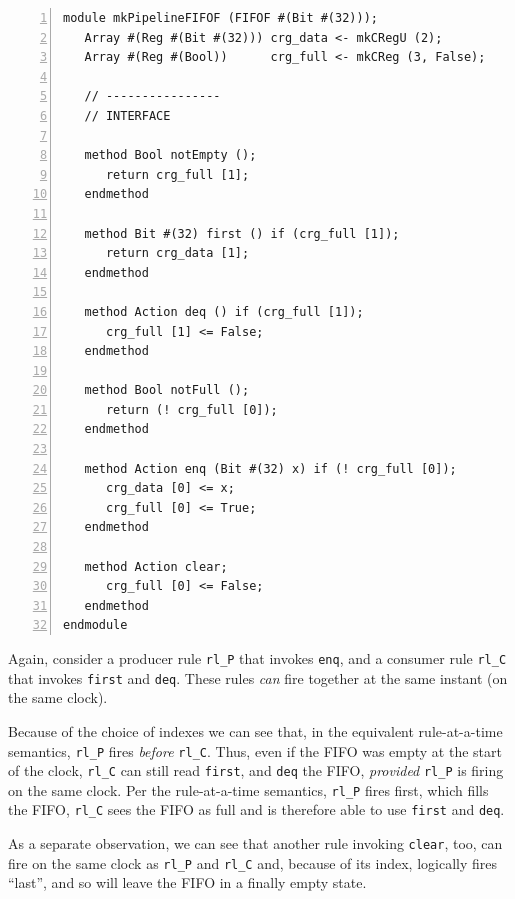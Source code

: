 {\footnotesize
\begin{Verbatim}[frame=single, numbers=left]
module mkPipelineFIFOF (FIFOF #(Bit #(32)));
   Array #(Reg #(Bit #(32))) crg_data <- mkCRegU (2);
   Array #(Reg #(Bool))      crg_full <- mkCReg (3, False);

   // ----------------
   // INTERFACE

   method Bool notEmpty ();
      return crg_full [1];
   endmethod

   method Bit #(32) first () if (crg_full [1]);
      return crg_data [1];
   endmethod

   method Action deq () if (crg_full [1]);
      crg_full [1] <= False;
   endmethod

   method Bool notFull ();
      return (! crg_full [0]);
   endmethod

   method Action enq (Bit #(32) x) if (! crg_full [0]);
      crg_data [0] <= x;
      crg_full [0] <= True;
   endmethod

   method Action clear;
      crg_full [0] <= False;
   endmethod
endmodule
\end{Verbatim}
}

Again, consider a producer rule \verb|rl_P| that invokes \verb|enq|,
and a consumer rule \verb|rl_C| that invokes \verb|first| and
\verb|deq|.  These rules \emph{can} fire together at the same instant
(on the same clock).

Because of the choice of indexes we can see that, in the equivalent
rule-at-a-time semantics, \verb|rl_P| fires \emph{before} \verb|rl_C|.
Thus, even if the FIFO was empty at the start of the clock,
\verb|rl_C| can still read \verb|first|, and \verb|deq| the FIFO,
\emph{provided} \verb|rl_P| is firing on the same clock.  Per the
rule-at-a-time semantics, \verb|rl_P| fires first, which fills the
FIFO, {\ie} \verb|rl_C| sees the FIFO as full and is therefore able to
use \verb|first| and \verb|deq|.

As a separate observation, we can see that another rule invoking
\verb|clear|, too, can fire on the same clock as \verb|rl_P| and
\verb|rl_C| and, because of its index, logically fires ``last'', and
so will leave the FIFO in a finally empty state.

